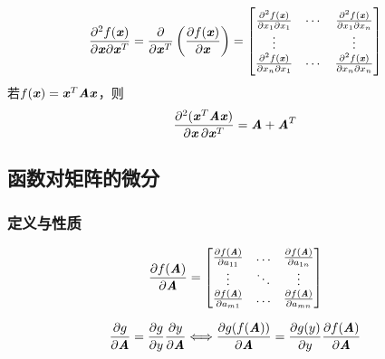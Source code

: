 \begin{definition}[Hessian矩阵]
    \[
        \frac{\partial^2 f(\boldsymbol{\mathit{x}})}{\partial \boldsymbol{\mathit{x}} \partial \boldsymbol{\mathit{x}}^T } = \frac{\partial}{\partial \boldsymbol{\mathit{x}}^T} \left(\frac{\partial f(\boldsymbol{\mathit{x}})}{\partial \boldsymbol{\mathit{x}}} \right) = \begin{bmatrix}
            \frac{\partial^2 f(\boldsymbol{\mathit{x}})}{\partial x_1 \partial x_1} &  \cdots & \frac{\partial^2 f(\boldsymbol{\mathit{x}})}{\partial x_1 \partial x_n} \\
            \vdots & & \vdots \\
            \frac{\partial^2 f(\boldsymbol{\mathit{x}})}{\partial x_n \partial x_1} &  \cdots & \frac{\partial^2 f(\boldsymbol{\mathit{x}})}{\partial x_n \partial x_n}
        \end{bmatrix}
    \]
    若$f(\boldsymbol{\mathit{x}}) = \boldsymbol{\mathit{x}}^T\boldsymbol{\mathit{A}}\boldsymbol{\mathit{x}}$，则
    \[
        \frac{\partial^2(\boldsymbol{\mathit{x}}^T\boldsymbol{\mathit{A}}\boldsymbol{\mathit{x}})}{\partial \boldsymbol{\mathit{x}} \, \partial \boldsymbol{\mathit{x}}^T} = \boldsymbol{\mathit{A}} + \boldsymbol{\mathit{A}}^T
    \]
\end{definition}

\subsection{函数对矩阵的微分}
\label{sub:函数对矩阵的微分}

\subsubsection{定义与性质}
\label{ssub:定义与性质}

\begin{definition}
    \[
        \frac{\partial f(\boldsymbol{\mathit{A}})}{\partial \boldsymbol{\mathit{A}}} = \begin{bmatrix}
            \frac{\partial f(\boldsymbol{\mathit{A}})}{\partial a_{11}}     &   \ldots  &   \frac{\partial f(\boldsymbol{\mathit{A}})}{\partial a_{1n}} \\
            \vdots                                      &   \ddots  &   \vdots                                  \\
            \frac{\partial f(\boldsymbol{\mathit{A}})}{\partial a_{m1}}     &   \ldots  &   \frac{\partial f(\boldsymbol{\mathit{A}})}{\partial a_{mn}}
        \end{bmatrix}
    \]
\end{definition}

\begin{theorem}
    \[
        \frac{\partial g}{\partial \boldsymbol{\mathit{A}}} =
        \frac{\partial g}{\partial y} \frac{\partial y}{\partial \boldsymbol{\mathit{A}}}
        \Longleftrightarrow
        \frac{\partial g(f(\boldsymbol{\mathit{A}}))}{\partial \boldsymbol{\mathit{A}}} =
        \frac{\partial g(y)}{\partial y} \frac{\partial f(\boldsymbol{\mathit{A}})}{\partial \boldsymbol{\mathit{A}}}
    \]
\end{theorem}


